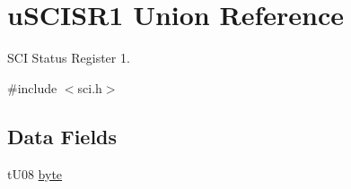 \hypertarget{unionu_s_c_i_s_r1}{}\section{u\+S\+C\+I\+S\+R1 Union Reference}
\label{unionu_s_c_i_s_r1}


S\+C\+I Status Register 1.  




{\ttfamily \#include $<$sci.\+h$>$}

\subsection*{Data Fields}
\begin{DoxyCompactItemize}
\item 
\hypertarget{unionu_s_c_i_s_r1_aba308d63db050aed25cfd36c37e41ad4}{}t\+U08 \hyperlink{unionu_s_c_i_s_r1_aba308d63db050aed25cfd36c37e41ad4}{byte}\label{unionu_s_c_i_s_r1_aba308d63db050aed25cfd36c37e41ad4}


\end{DoxyCompactItemize}
